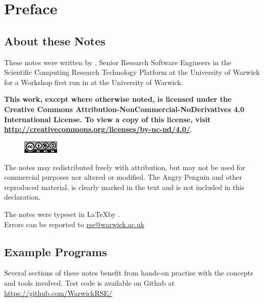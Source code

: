 \documentclass[12pt, openany]{book}
\makeatletter
\let\newauthor\@author
\makeatother
\begin{document}

\let\cleardoublepage\clearpage
\setcounter{tocdepth}{1}

\tableofcontents


\frontmatter \chapter{Preface}
\section{About these Notes}
These notes were written by \newauthor, Senior Research Software Engineers in the Scientific Computing Research Technology Platform at the University of Warwick for a Workshop first run in  at the University of Warwick.

\textbf{This work, except where otherwise noted, is licensed under the Creative Commons Attribution-NonCommercial-NoDerivatives 4.0 International License. To view a copy of this license, visit \url{http://creativecommons.org/licenses/by-nc-nd/4.0/}}. 
\begin{figure}[h]
\includegraphics[width=0.15\textwidth]{by-nc-sa-eu}
\end{figure}

\noindent The notes may redistributed freely with attribution, but may not be used for commercial purposes nor altered or modified. The Angry Penguin and other reproduced material, is clearly marked in the text and is not included in this declaration. 

The notes  were typeset in \LaTeX by \typesettername. \\Errors can be reported to \href{mailto:rse@warwick.ac.uk}{rse@warwick.ac.uk}

\section{Example Programs}\label{sec:egCode}
Several sections of these notes benefit from hands-on practise with the concepts and tools involved. Test code is available on Github at \url{https://github.com/WarwickRSE/}
\end{document}
